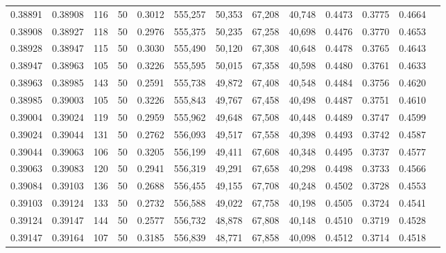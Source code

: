 \begin{tabular}{rrrrrrrrrrrrr}
0.38891 & 0.38908 &   116 &  50 &                                     0.3012 & 555,257 &  50,353 &  67,208 &  40,748 & 0.4473 & 0.3775 & 0.4664 \\
0.38908 & 0.38927 &   118 &  50 &                                     0.2976 & 555,375 &  50,235 &  67,258 &  40,698 & 0.4476 & 0.3770 & 0.4653 \\
0.38928 & 0.38947 &   115 &  50 &                                     0.3030 & 555,490 &  50,120 &  67,308 &  40,648 & 0.4478 & 0.3765 & 0.4643 \\
0.38947 & 0.38963 &   105 &  50 &                                     0.3226 & 555,595 &  50,015 &  67,358 &  40,598 & 0.4480 & 0.3761 & 0.4633 \\
0.38963 & 0.38985 &   143 &  50 &                                     0.2591 & 555,738 &  49,872 &  67,408 &  40,548 & 0.4484 & 0.3756 & 0.4620 \\
0.38985 & 0.39003 &   105 &  50 &                                     0.3226 & 555,843 &  49,767 &  67,458 &  40,498 & 0.4487 & 0.3751 & 0.4610 \\
0.39004 & 0.39024 &   119 &  50 &                                     0.2959 & 555,962 &  49,648 &  67,508 &  40,448 & 0.4489 & 0.3747 & 0.4599 \\
0.39024 & 0.39044 &   131 &  50 &                                     0.2762 & 556,093 &  49,517 &  67,558 &  40,398 & 0.4493 & 0.3742 & 0.4587 \\
0.39044 & 0.39063 &   106 &  50 &                                     0.3205 & 556,199 &  49,411 &  67,608 &  40,348 & 0.4495 & 0.3737 & 0.4577 \\
0.39063 & 0.39083 &   120 &  50 &                                     0.2941 & 556,319 &  49,291 &  67,658 &  40,298 & 0.4498 & 0.3733 & 0.4566 \\
0.39084 & 0.39103 &   136 &  50 &                                     0.2688 & 556,455 &  49,155 &  67,708 &  40,248 & 0.4502 & 0.3728 & 0.4553 \\
0.39103 & 0.39124 &   133 &  50 &                                     0.2732 & 556,588 &  49,022 &  67,758 &  40,198 & 0.4505 & 0.3724 & 0.4541 \\
0.39124 & 0.39147 &   144 &  50 &                                     0.2577 & 556,732 &  48,878 &  67,808 &  40,148 & 0.4510 & 0.3719 & 0.4528 \\
0.39147 & 0.39164 &   107 &  50 &                                     0.3185 & 556,839 &  48,771 &  67,858 &  40,098 & 0.4512 & 0.3714 & 0.4518 \\

\end{tabular}
